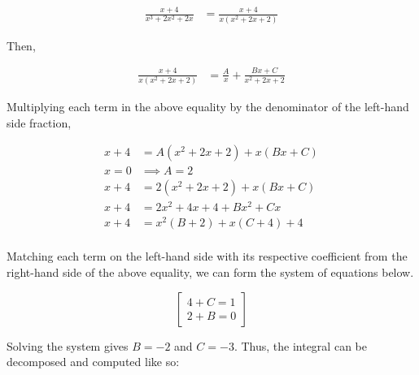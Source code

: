 \documentclass{article}
\begin{document}
    \begin{align*}
        \frac{x+4}{x^3+2x^2+2x} &= \frac{x+4}{x\left(x^2+2x+2\right)}
    \end{align*}

    Then,

    \begin{align*}
        \frac{x+4}{x\left(x^2+2x+2\right)}  &= \frac{A}{x} + \frac{Bx+C}{x^2+2x+2}
    \end{align*}

    Multiplying each term in the above equality by the denominator of the left-hand side fraction,

    \begin{align*}
        x+4 &= A\left(x^2 + 2x+2\right) + x(Bx+C) \\
        x=0 &\implies A=2 \\
        x+4 &= 2\left(x^2+2x+2\right) + x(Bx+C) \\
        x+4 &= 2x^2 + 4x + 4 + Bx^2 + Cx \\
        x+4 &= x^2\left(B+2\right) + x\left(C+4\right) + 4 \\
    \end{align*}

    Matching each term on the left-hand side with its respective coefficient from the right-hand side of the above equality, we can form the system of equations below.

    \[
        \begin{bmatrix}
            4 + C = 1 \\
            2 + B = 0
        \end{bmatrix}
    \]

    Solving the system gives $B=-2$ and $C=-3$. Thus, the integral can be decomposed and computed like so:
\end{document}
